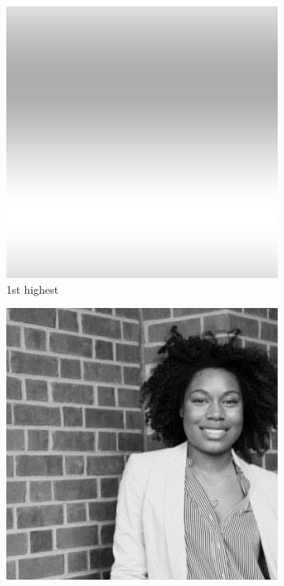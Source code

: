 \begin{figure}[h!]
\centering
\begin{subfigure}{0.2\textwidth}
  \centering
  \includegraphics[width=0.95\linewidth]{output/magnitud_high_1}
  \caption{1st highest}
\end{subfigure}%
\begin{subfigure}{0.2\textwidth}
  \centering
  \includegraphics[width=0.95\linewidth]{output/magnitud_high_25}

\end{subfigure}
\end{figure}
